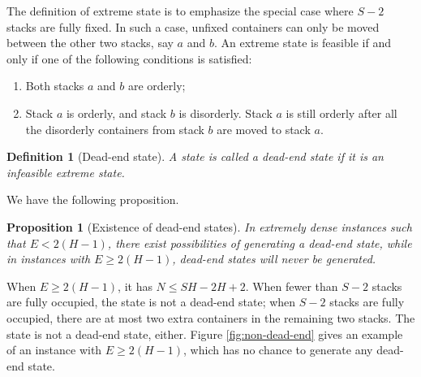 \documentclass[review,3p,times,12pt,number]{elsarticle}\usepackage{amsmath}\usepackage{amssymb}
\newtheorem{proposition}{Proposition}
\newtheorem{definition}{Definition}
\begin{document}
The definition of extreme state is to emphasize the special case where $S-2$ stacks are fully fixed. In such a case, unfixed containers can only be moved between the other two stacks, say $a$ and $b$. An extreme state is feasible if and only if one of the following conditions is satisfied:
\begin{enumerate}
\item Both stacks $a$ and $b$ are orderly;
\item Stack $a$ is orderly, and stack $b$ is disorderly. Stack $a$ is still orderly after all the disorderly containers from stack $b$ are moved to stack $a$.
\end{enumerate}

\begin{definition}[Dead-end state]
A state is called a dead-end state if it is an infeasible extreme state.
\end{definition}


We have the following proposition.

\begin{proposition}[Existence of dead-end states]
In extremely dense instances such that $E<2(H-1)$, there exist possibilities of generating a dead-end state, while in instances with $E\ge2(H-1)$, dead-end states will never be generated.
\end{proposition}

When $E\ge 2(H-1)$, it has $N\le SH-2H+2$. When fewer than $S-2$ stacks are fully occupied, the state is not a dead-end state; when $S-2$ stacks are fully occupied, there are at most two extra containers in the remaining two stacks. The state is not a dead-end state, either. 
Figure \ref{fig:non-dead-end} gives an example of an instance with $E\ge2(H-1)$, which has no chance to generate any dead-end state.
\end{document}
